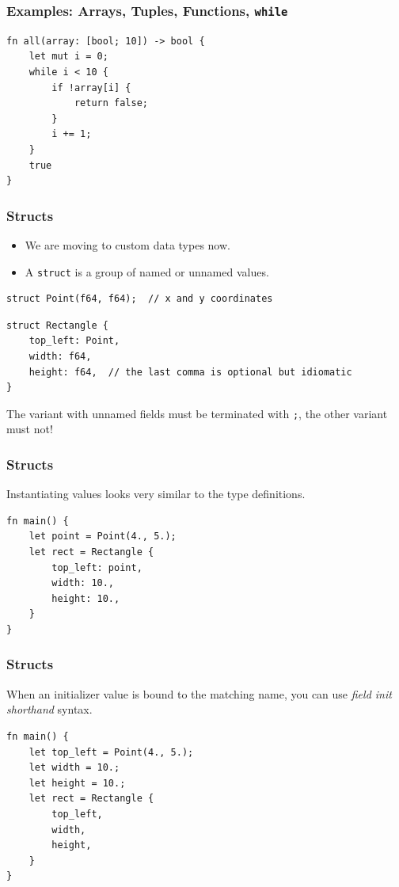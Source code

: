\begin{frame}[fragile]
    \frametitle{Examples: Arrays, Tuples, Functions, \texttt{while}}
    \begin{verbatim}
fn all(array: [bool; 10]) -> bool {
    let mut i = 0;
    while i < 10 {
        if !array[i] {
            return false;
        }
        i += 1;
    }
    true
}
    \end{verbatim}
\end{frame}

\begin{frame}[fragile]
    \frametitle{Structs}
    \begin{itemize}
        \item We are moving to custom data types now.
        \item A \texttt{struct} is a group of named or unnamed values.
    \end{itemize}
    \pause
    \vfill
    \begin{verbatim}
struct Point(f64, f64);  // x and y coordinates
    \end{verbatim}
    \pause
    \vfill
    \begin{verbatim}
struct Rectangle {
    top_left: Point,
    width: f64,
    height: f64,  // the last comma is optional but idiomatic
}
    \end{verbatim}
    \pause
    \vfill
    The variant with unnamed fields must be terminated with \texttt{;}, the other variant must not!
\end{frame}

\begin{frame}[fragile]
    \frametitle{Structs}
    Instantiating values looks very similar to the type definitions.
    \pause
    \vfill
    \begin{verbatim}
fn main() {
    let point = Point(4., 5.);
    let rect = Rectangle {
        top_left: point,
        width: 10.,
        height: 10.,
    }
}
    \end{verbatim}
\end{frame}

\begin{frame}[fragile]
    \frametitle{Structs}
    When an initializer value is bound to the matching name, you can use \textit{field init shorthand} syntax.
    \pause
    \vfill
    \begin{verbatim}
fn main() {
    let top_left = Point(4., 5.);
    let width = 10.;
    let height = 10.;
    let rect = Rectangle {
        top_left,
        width,
        height,
    }
}
    \end{verbatim}
\end{frame}

